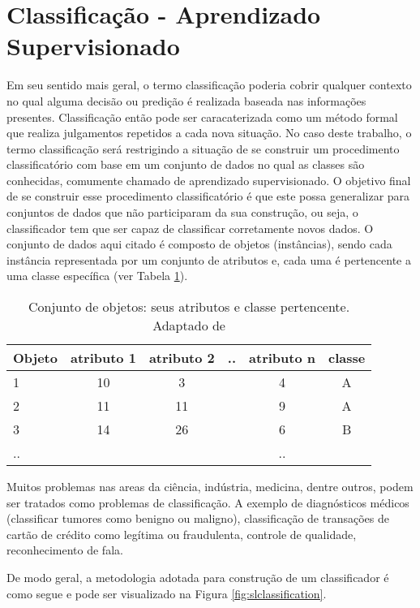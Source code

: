 \section{Classificação - Aprendizado Supervisionado}
Em seu sentido mais geral, o termo classificação poderia cobrir qualquer contexto no qual alguma decisão ou predição é realizada baseada nas informações presentes. Classificação então pode ser caracaterizada como um método formal que realiza julgamentos repetidos a cada nova situação. No caso deste trabalho, o termo classificação será restrigindo a situação de se construir um procedimento classificatório com base em um conjunto de dados no qual as classes são conhecidas, comumente chamado de aprendizado supervisionado\cite{Michie:1994}. O objetivo final de se construir esse procedimento classificatório é que este possa generalizar para conjuntos de dados que não participaram da sua construção, ou seja, o classificador tem que ser capaz de classificar corretamente novos dados\cite{Kotsiantis:2007}. O conjunto de dados aqui citado é composto de objetos (instâncias), sendo cada instância representada por um conjunto de atributos e, cada uma é pertencente a uma classe específica (ver Tabela \ref{table:dsex1}).

\begin{table}[!htp]
  \centering
  \begin{tabular}{ |l|c c c c |c|}
    \hline
       {\bf Objeto} & {\bf atributo 1} & {\bf atributo 2} & {\bf ..} & {\bf atributo n} & {\bf classe} \\
    \hline
       1 & 10 & 3 &  & 4 & A \\
    \hline
       2 & 11 & 11 &  & 9 & A \\
    \hline
       3 & 14 & 26 &  & 6 & B \\
    \hline
       .. &  &  &  & .. & \\
    \hline
  \end{tabular}
  \caption{Conjunto de objetos: seus atributos e classe pertencente. Adaptado de \cite{Kotsiantis:2007}}
  \label{table:dsex1}
\end{table}

Muitos problemas nas areas da ciência, indústria, medicina, dentre outros, podem ser tratados como problemas de classificação. A exemplo de diagnósticos médicos (classificar tumores como benigno ou maligno), classificação de transações de cartão de crédito como legítima ou fraudulenta, controle de qualidade, reconhecimento de fala.\cite{Zhang:2000} 

De modo geral, a metodologia adotada para construção de um classificador é como segue e pode ser visualizado na Figura \ref{fig:slclassification}.

